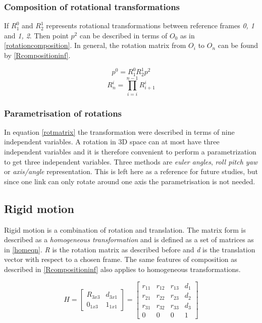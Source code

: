 \subsubsection{Composition of rotational transformations}

If $R^0_1$ and $R^1_2$ represents rotational transformations between reference frames \textit{0, 1} and \textit{1, 2}. Then point $p^2$ can be described in terms of $O_0$ as in \eqref{rotationcomposition}. In general, the rotation matrix from $O_i$ to $O_n$ can be found by \eqref{Rcompositioninf}.

\begin{equation}\label{rotationcomposition}
p^0 = R^0_1 R^1_2 p^2
\end{equation}
\vspace{-0.4cm}
\begin{equation}\label{Rcompositioninf}
R^i_n = \prod_{i=i}^{n-1} R^i_{i+1}
\end{equation}


\subsubsection{Parametrisation of rotations}

In equation \eqref{rotmatrix} the transformation were described in terms of nine independent variables. A rotation in 3D space can at most have three independent variables and it is therefore convenient to perform a parametrization to get three independent variables. Three methods are \textit{euler angles}, \textit{roll pitch yaw} or \textit{axis/angle} representation. This is left here as a reference for future studies, but since one link can only rotate around one axis the parametrisation is not needed.

\subsection{Rigid motion}

Rigid motion is a combination of rotation and translation. The matrix form is described as a \textit{homogeneous transformation} and is defined as a set of matrices as in \eqref{homeqn}. \textit{R} is the rotation matrix as described before and \textit{d} is the translation vector with respect to a chosen frame. The same features of composition as described in \eqref{Rcompositioninf} also applies to homogeneous transformations.

\begin{equation}\label{homeqn}
H = \begin{bmatrix}
R_{3x3} & d_{3x1}\\ 
0_{1x3} & 1_{1x1}
\end{bmatrix}=\begin{bmatrix}
r_{11} & r_{12} & r_{13} & d_{1}\\ 
r_{21} & r_{22} & r_{23} & d_{2}\\ 
r_{31} & r_{32} & r_{33} & d_{3}\\ 
0 & 0 & 0 & 1
\end{bmatrix}
\end{equation}


